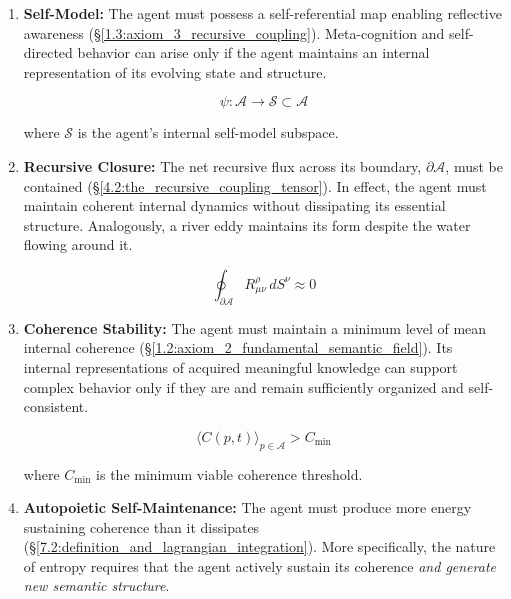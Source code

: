 \begin{enumerate}

    \item \textbf{Self-Model:} The agent must possess a self-referential map enabling reflective awareness (\S\ref{1.3:axiom_3_recursive_coupling}). Meta-cognition and self-directed behavior can arise only if the agent maintains an internal representation of its evolving state and structure.

    \begin{equation}
        \psi: \mathcal{A} \to \mathcal{S} \subset \mathcal{A}
    \end{equation}
    
    where \(\mathcal{S}\) is the agent's internal self-model subspace.

    \item \textbf{Recursive Closure:} The net recursive flux across its boundary, \(\partial \mathcal{A}\), must be contained (\S\ref{4.2:the_recursive_coupling_tensor}). In effect, the agent must maintain coherent internal dynamics without dissipating its essential structure. Analogously, a river eddy maintains its form despite the water flowing around it.

    \begin{equation}
        \oint_{\partial \mathcal{A}} R^\rho_{\mu\nu} \, dS^\nu \approx 0
    \end{equation}

    \item \textbf{Coherence Stability:} The agent must maintain a minimum level of mean internal coherence (\S\ref{1.2:axiom_2_fundamental_semantic_field}). Its internal representations of acquired meaningful knowledge can support complex behavior only if they are and remain sufficiently organized and self-consistent. 

    \begin{equation}
        \langle C(p,t) \rangle_{p \in \mathcal{A}} > C_{\text{min}}
    \end{equation}
    
    where \(C_{\text{min}}\) is the minimum viable coherence threshold.

    \item \textbf{Autopoietic Self-Maintenance:} The agent must produce more energy sustaining coherence than it dissipates (\S\ref{7.2:definition_and_lagrangian_integration}). More specifically, the nature of entropy requires that the agent actively sustain its coherence \textit{and generate new semantic structure}.


\end{enumerate}
